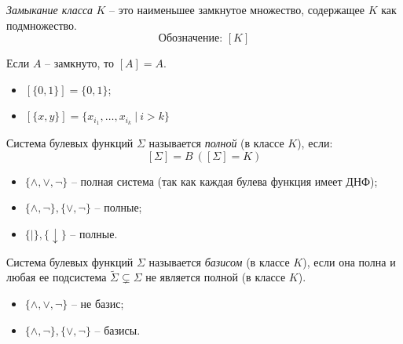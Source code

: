 \begin{definition}
    \emph{Замыкание класса} $K$ -- это наименьшее замкнутое множество, содержащее $K$ как подмножество.
    \[
        \text{Обозначение: }[K]
    \]

    Если $A$ -- замкнуто, то $[A] = A$.
\end{definition}

\begin{example}\leavevmode
    \begin{itemize}
        \item $[\{0,1\}] = \{0,1\}$;
        \item $[\{x,y\}] = \{x_{i_1},\ldots,x_{i_k} \ \big| \ i > k\}$
    \end{itemize}
\end{example}

\begin{definition}
    Система булевых функций $\Sigma$ называется \emph{полной} (в классе $K$), если:
    \[
        [\Sigma] = B \ ([\Sigma] = K)
    \]
\end{definition}

\begin{example}\leavevmode
    \begin{itemize}
        \item $\{\land,\lor,\lnot\}$ -- полная система (так как каждая булева функция имеет ДНФ);
        \item $\{\land,\lnot\},\{\lor,\lnot\}$ -- полные;
        \item $\{\vert\},\{\downarrow\}$ -- полные.
    \end{itemize}
\end{example}

\begin{definition}[Базис]
    Система булевых функций $\Sigma$ называется \emph{базисом} (в классе $K$), если она полна и любая ее подсистема $\widetilde{\Sigma} \subsetneq \Sigma$ не является полной (в классе $K$).
\end{definition}

\begin{example}\leavevmode
    \begin{itemize}
        \item $\{\land,\lor,\lnot\}$ -- не базис;
        \item $\{\land,\lnot\},\{\lor,\lnot\}$ -- базисы.
    \end{itemize}
\end{example}

